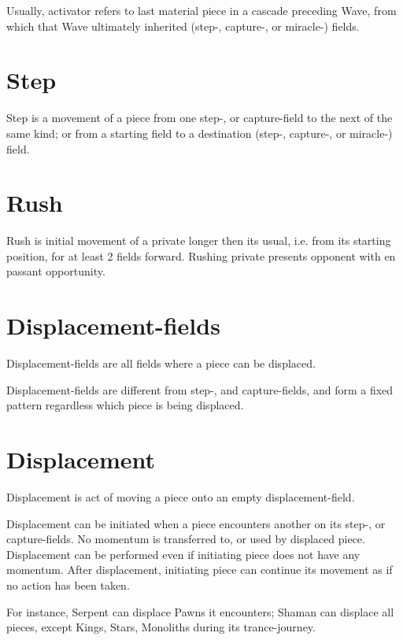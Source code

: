 Usually, activator refers to last material piece in a cascade preceding Wave,
from which that Wave ultimately inherited (step-, capture-, or miracle-) fields.

\section*{Step}
\label{sec:Terms/Step}
Step is a movement of a piece from one step-, or capture-field to the next of
the same kind; or from a starting field to a destination (step-, capture-, or
miracle-) field.

\section*{Rush}
\label{sec:Terms/Rush}
Rush is initial movement of a private longer then its usual, i.e. from its starting
position, for at least 2 fields forward. Rushing private presents opponent with en
passant opportunity.

\section*{Displacement-fields}
\label{sec:Terms/Displacement-fields}
Displacement-fields are all fields where a piece can be displaced.

Displacement-fields are different from step-, and capture-fields, and form a fixed
pattern regardless which piece is being displaced.

\section*{Displacement}
\label{sec:Terms/Displacement}
Displacement is act of moving a piece onto an empty displacement-field.

Displacement can be initiated when a piece encounters another on its step-,
or capture-fields. No momentum is transferred to, or used by displaced piece.
Displacement can be performed even if initiating piece does not have any
momentum. After displacement, initiating piece can continue its movement
as if no action has been taken.

For instance, Serpent can displace Pawns it encounters; Shaman can displace
all pieces, except Kings, Stars, Monoliths during its trance-journey.

